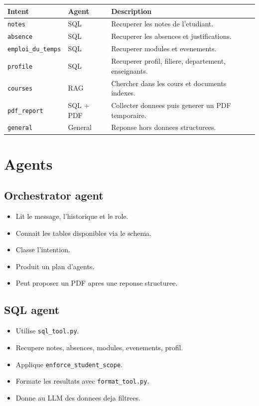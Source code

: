 \documentclass[11pt,a4paper]{article}
\begin{document}
\begin{longtable}{p{3.2cm}p{2.5cm}p{8cm}}
\toprule
\textbf{Intent} & \textbf{Agent} & \textbf{Description}\\
\midrule
\texttt{notes} & SQL & Recuperer les notes de l'etudiant.\\
\texttt{absence} & SQL & Recuperer les absences et justifications.\\
\texttt{emploi\_du\_temps} & SQL & Recuperer modules et evenements.\\
\texttt{profile} & SQL & Recuperer profil, filiere, departement, enseignants.\\
\texttt{courses} & RAG & Chercher dans les cours et documents indexes.\\
\texttt{pdf\_report} & SQL + PDF & Collecter donnees puis generer un PDF temporaire.\\
\texttt{general} & General & Reponse hors donnees structurees.\\
\bottomrule
\end{longtable}

\section{Agents}

\subsection{Orchestrator agent}

\begin{itemize}[leftmargin=1.2cm]
  \item Lit le message, l'historique et le role.
  \item Connait les tables disponibles via le schema.
  \item Classe l'intention.
  \item Produit un plan d'agents.
  \item Peut proposer un PDF apres une reponse structuree.
\end{itemize}

\subsection{SQL agent}

\begin{itemize}[leftmargin=1.2cm]
  \item Utilise \texttt{sql\_tool.py}.
  \item Recupere notes, absences, modules, evenements, profil.
  \item Applique \texttt{enforce\_student\_scope}.
  \item Formate les resultats avec \texttt{format\_tool.py}.
  \item Donne au LLM des donnees deja filtrees.
\end{itemize}
\end{document}
